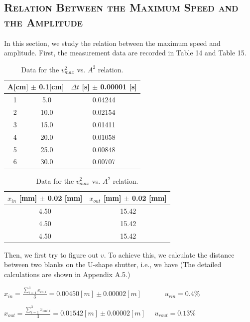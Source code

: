 \documentclass[a4paper,12pt]{article}
\begin{document}
\subsection{\textsc{Relation Between the Maximum Speed and the Amplitude}}
In this section, we study the relation between the maximum speed and amplitude. First, the measurement data are recorded in Table 14 and Table 15.

\begin{table}[h]
\begin{center}
\begin{tabular}{|c|c|c|}
\hline
\multicolumn{2}{|c|}{A[cm] $\pm$ 0.1[cm]} & $\Delta t$ [s] $\pm$ 0.00001 [s] \\
\hline
1 & 5.0 & 0.04244 \\
2 & 10.0 & 0.02154 \\
3 & 15.0 & 0.01411 \\
4 & 20.0 & 0.01058 \\
5 & 25.0 & 0.00848 \\
6 & 30.0 & 0.00707 \\
\hline
\end{tabular}
\end{center}
\caption{Data for the $v_{max}^2$ vs. $A^2$ relation.}
\end{table}

\begin{table}[h]
\begin{center}
\begin{tabular}{|c|c|}
\hline
$x_{in}$ [mm] $\pm$ 0.02 [mm] & $x_{out}$ [mm] $\pm$ 0.02 [mm] \\
\hline
4.50 & 15.42 \\
4.50 & 15.42 \\
4.50 & 15.42 \\
\hline
\end{tabular}
\end{center}
\caption{Data for the $v_{max}^2$ vs. $A^2$ relation.}
\end{table}

\newpage
Then, we first try to figure out $v$. To achieve this, we calculate the distance between two blanks on the U-shape shutter, i.e., we have (The detailed calculations are shown in Appendix A.5.)
\begin{center}
$\displaystyle x_{in} = \frac{\sum_{i=1}^3x_{in,i}}{3} = 0.00450 [m] \pm 0.00002 [m]$ ~~~~~~$ u_{rin} = 0.4\% $
\end{center}
\begin{center}
$\displaystyle x_{out} = \frac{\sum_{i=1}^3x_{out,i}}{3} = 0.01542 [m] \pm 0.00002 [m] ~~~~~~ u_{rout} = 0.13\% $
\end{center}
\end{document}
